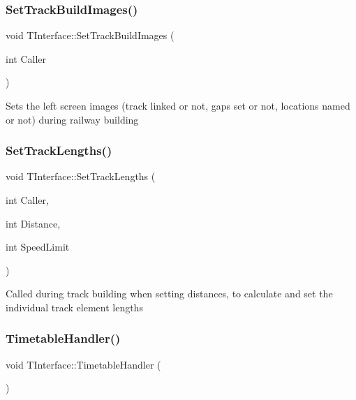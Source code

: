 \subsubsection{\texorpdfstring{Set\+Track\+Build\+Images()}{SetTrackBuildImages()}}
{\footnotesize\ttfamily void T\+Interface\+::\+Set\+Track\+Build\+Images (\begin{DoxyParamCaption}\item[{int}]{Caller }\end{DoxyParamCaption})\hspace{0.3cm}{\ttfamily [private]}}

Sets the left screen images (track linked or not, gaps set or not, locations named or not) during railway building \mbox{\label{class_t_interface_acc36eb15dae8d564e6d91f8c6596065c}} 
\subsubsection{\texorpdfstring{Set\+Track\+Lengths()}{SetTrackLengths()}}
{\footnotesize\ttfamily void T\+Interface\+::\+Set\+Track\+Lengths (\begin{DoxyParamCaption}\item[{int}]{Caller,  }\item[{int}]{Distance,  }\item[{int}]{Speed\+Limit }\end{DoxyParamCaption})\hspace{0.3cm}{\ttfamily [private]}}

Called during track building when setting distances, to calculate and set the individual track element lengths \mbox{\label{class_t_interface_a4502fb89b8be8afeaf2771fbe5d0cd75}} 
\subsubsection{\texorpdfstring{Timetable\+Handler()}{TimetableHandler()}}
{\footnotesize\ttfamily void T\+Interface\+::\+Timetable\+Handler (\begin{DoxyParamCaption}{ }\end{DoxyParamCaption})\hspace{0.3cm}{\ttfamily [private]}}

